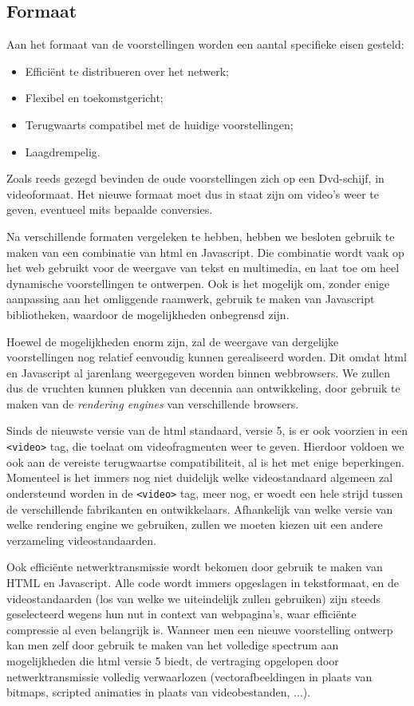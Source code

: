 \subsection{Formaat}

Aan het formaat van de voorstellingen worden een aantal specifieke eisen gesteld:
\begin{itemize}
\item Efficiënt te distribueren over het netwerk;
\item Flexibel en toekomstgericht;
\item Terugwaarts compatibel met de huidige voorstellingen;
\item Laagdrempelig.
\end{itemize}

Zoals reeds gezegd bevinden de oude voorstellingen zich op een Dvd-schijf, in videoformaat. Het nieuwe formaat moet dus in staat zijn om video's weer te geven, eventueel mits bepaalde conversies.

Na verschillende formaten vergeleken te hebben, hebben we besloten gebruik te maken van een combinatie van \ac{html} en Javascript. Die combinatie wordt vaak op het web gebruikt voor de weergave van tekst en multimedia, en laat toe om heel dynamische voorstellingen te ontwerpen. Ook is het mogelijk om, zonder enige aanpassing aan het omliggende raamwerk, gebruik te maken van Javascript bibliotheken, waardoor de mogelijkheden onbegrensd zijn.

Hoewel de mogelijkheden enorm zijn, zal de weergave van dergelijke voorstellingen nog relatief eenvoudig kunnen gerealiseerd worden. Dit omdat \ac{html} en Javascript al jarenlang weergegeven worden binnen webbrowsers. We zullen dus de vruchten kunnen plukken van decennia aan ontwikkeling, door gebruik te maken van de \emph{rendering engines} van verschillende browsers.

Sinds de nieuwste versie van de \ac{html} standaard, versie 5, is er ook voorzien in een \texttt{<video>} tag, die toelaat om videofragmenten weer te geven. Hierdoor voldoen we ook aan de vereiste terugwaartse compatibiliteit, al is het met enige beperkingen. Momenteel is het immers nog niet duidelijk welke videostandaard algemeen zal ondersteund worden in de \texttt{<video>} tag, meer nog, er woedt een hele strijd tussen de verschillende fabrikanten en ontwikkelaars. Afhankelijk van welke versie van welke rendering engine we gebruiken, zullen we moeten kiezen uit een andere verzameling videostandaarden.

Ook efficiënte netwerktransmissie wordt bekomen door gebruik te maken van HTML en Javascript. Alle code wordt immers opgeslagen in tekstformaat, en de videostandaarden (los van welke we uiteindelijk zullen gebruiken) zijn steeds geselecteerd wegens hun nut in context van webpagina's, waar efficiënte compressie al even belangrijk is. Wanneer men een nieuwe voorstelling ontwerp kan men zelf door gebruik te maken van het volledige spectrum aan mogelijkheden die \ac{html} versie 5 biedt, de vertraging opgelopen door netwerktransmissie volledig verwaarlozen (vectorafbeeldingen in plaats van bitmaps, scripted animaties in plaats van videobestanden, ...).

